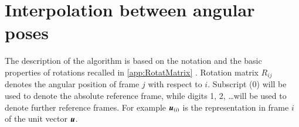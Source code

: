 \begin{table}[!t]
   \begin{framed}
     \printnomenclature
   \end{framed}
\end{table}
    
\section{Interpolation between angular poses}
\label{sec:interpolation}
The description of the algorithm is based on the notation and the basic properties of rotations recalled in \ref{app:RotatMatrix} \cite{legnani1996a,legnani1996b}. Rotation matrix $R_{ij}$ denotes the angular position of frame $j$ with respect to $i$. Subscript (0) will be used to denote the absolute reference frame, while digits 1, 2, \ldots will be used to denote further reference frames. For example ${\boldsymbol{u}}_{(i)}$ is the representation in frame $i$ of the unit vector ${\boldsymbol{u}}$.


